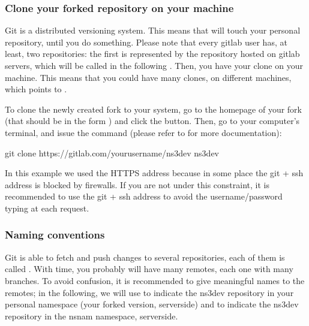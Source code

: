 \documentclass[letterpaper,10pt,english]{sphinxmanual}
\renewcommand{\sphinxcode}[1]{\texttt{\small{#1}}}
\begin{document}
\subsubsection{Clone your forked repository on your machine}
\label{\detokenize{working-with-git:clone-your-forked-repository-on-your-machine}}
Git is a distributed versioning system. This means that  will touch your personal repository, until you do something. Please note that every gitlab user has, at least, two repositories: the first is represented by the repository hosted on gitlab servers, which will be called in the following \sphinxcode{}. Then, you have your clone on your machine. This means that you could have many clones, on different machines, which points to \sphinxcode{}.

To clone the newly created fork to your system, go to the homepage of your fork (that should be in the form ) and click the  button. Then, go to your computer’s terminal, and issue the command (please refer to  for more documentation):

\begin{sphinxVerbatim}[commandchars=\\\{\}]
\PYGZdl{} git clone https://gitlab.com/your\PYGZhy{}user\PYGZhy{}name/ns\PYGZhy{}3\PYGZhy{}dev
\PYGZdl{}  ns\PYGZhy{}3\PYGZhy{}dev
\end{sphinxVerbatim}

In this example we used the HTTPS address because in some place the git + ssh address is blocked by firewalls. If you are not under this constraint, it is recommended to use the git + ssh address to avoid the username/password typing at each request.


\subsubsection{Naming conventions}
\label{\detokenize{working-with-git:naming-conventions}}
Git is able to fetch and push changes to several repositories, each of them is called \sphinxcode{}. With time, you probably will have many remotes, each one with many branches. To avoid confusion, it is recommended to give meaningful names to the remotes; in the following, we will use \sphinxcode{} to indicate the ns\sphinxhyphen{}3\sphinxhyphen{}dev repository in your personal namespace (your forked version, server\sphinxhyphen{}side) and \sphinxcode{} to indicate the ns\sphinxhyphen{}3\sphinxhyphen{}dev repository in the nsnam namespace, server\sphinxhyphen{}side.
\end{document}
